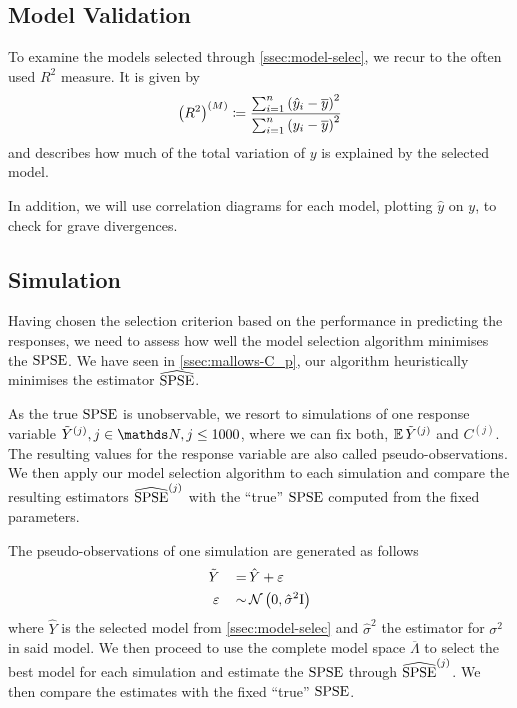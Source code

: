 		\medskip
		\begin{tcolorbox}[colframe=black,colbacktitle=white,coltitle=black, attach boxed title to top center={yshift=-2mm},enhanced, titlerule=0.1pt, boxrule=0.5pt, arc=5pt,title=Listing:\quad SANN algorithm]
			
		\end{tcolorbox}
		\medskip

		
	\subsection{Model Validation}
	\label{ssec:model-validation}
	
		To examine the models selected through \ref{ssec:model-selec}, we recur to the often used $R^2$ measure.
		It is given by
		\[
			\left( R^2 \right)^{(M)} \coloneqq \frac {\sum_{i=1}^n \left( \hat{y}_i - \overline{y} \right)^2}{\sum_{i=1}^n \left( y_i - \overline{y} \right)^2}
		\]
		and describes how much of the total variation of $y$ is explained by the selected model.
		
		In addition, we will use correlation diagrams for each model, plotting $\hat{y}$ on $y$, to check for grave divergences.
	
	\subsection{Simulation}
	\label{ssec:simulation}
	
		Having chosen the selection criterion based on the performance in predicting the responses, we need to assess how well the model selection algorithm minimises the $\mathrm{SPSE}$.
		We have seen in \ref{ssec:mallows-C_p}, our algorithm heuristically minimises the estimator $\widehat{\mathrm{SPSE}}$.
		
		As the true $\mathrm{SPSE}$ is unobservable, we resort to simulations of one response variable $\tilde{Y}^{(j)}, j \in \SN, j \leq 1000$, where we can fix both, $\operatorname{\mathbb{E}}{\tilde{Y}^{(j)}}$ and $C^{(j)}$.
		The resulting values for the response variable are also called pseudo-observations.
		We then apply our model selection algorithm to each simulation and compare the resulting estimators $\widehat{\mathrm{SPSE}}^{(j)}$ with the \enquote{true} $\mathrm{SPSE}$ computed from the fixed parameters.
				
		The pseudo-observations of one simulation are generated as follows
		\begin{alignat*}{3}
			\tilde{Y} &&\, = \, & \hat{Y} + \varepsilon \\
			\varepsilon &&\, \sim \, & \mathcal{N} \left( 0,\hat{\sigma}^2\mathrm{I} \right)
		\end{alignat*}
		where $\hat{Y}$ is the selected model from \ref{ssec:model-selec} and $\hat{\sigma}^2$ the estimator for $\sigma^2$ in said model.
		We then proceed to use the complete model space $\overline{\Lambda}$ to select the best model for each simulation and estimate the $\mathrm{SPSE}$ through $\widehat{\mathrm{SPSE}}^{(j)}$.
		We then compare the estimates with the fixed \enquote{true} $\mathrm{SPSE}$.
		
